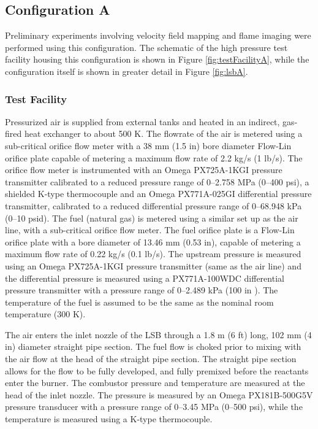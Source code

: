 \subsection{Configuration A}
\label{subsec:lsb-configuration-a}

Preliminary experiments involving velocity field mapping and flame imaging were performed using this configuration.
The schematic of the high pressure test facility housing this configuration is shown in Figure \ref{fig:testFacilityA}, while the configuration itself is shown in greater detail in Figure \ref{fig:lsbA}.

\subsubsection{Test Facility}
\label{subsubsec:configuration-a-test-facility}



Pressurized air is supplied from external tanks and heated in an indirect, gas-fired heat exchanger to about 500 K.
The flowrate of the air is metered using a sub-critical orifice flow meter with a 38 mm (1.5 in) bore diameter Flow-Lin orifice plate capable of metering a maximum flow rate of 2.2 kg/s (1 lb/s).
The orifice flow meter is instrumented with an Omega PX725A-1KGI pressure transmitter calibrated to a reduced pressure range of 0--2.758 MPa (0--400 psi), a shielded K-type thermocouple and an Omega PX771A-025GI differential pressure transmitter, calibrated to a reduced differential pressure range of 0--68.948 kPa (0--10 psid).
The fuel (natural gas) is metered using a similar set up as the air line, with a sub-critical orifice flow meter.
The fuel orifice plate is a Flow-Lin orifice plate with a bore diameter of 13.46 mm (0.53 in), capable of metering a maximum flow rate of 0.22 kg/s (0.1 lb/s).
The upstream pressure is measured using an Omega PX725A-1KGI pressure transmitter (same as the air line) and the differential pressure is measured using a PX771A-100WDC differential pressure transmitter with a pressure range of 0--2.489 kPa (100 in ).
The temperature of the fuel is assumed to be the same as the nominal room temperature (300 K).

The air enters the inlet nozzle of the LSB through a 1.8 m (6 ft) long, 102 mm (4 in) diameter straight pipe section.
The fuel flow is choked prior to mixing with the air flow at the head of the straight pipe section.
The straight pipe section allows for the flow to be fully developed, and fully premixed before the reactants enter the burner.
The combustor pressure and temperature are measured at the head of the inlet nozzle.
The pressure is measured by an Omega PX181B-500G5V pressure transducer with a pressure range of 0--3.45 MPa (0--500 psi), while the temperature is measured using a K-type thermocouple.

